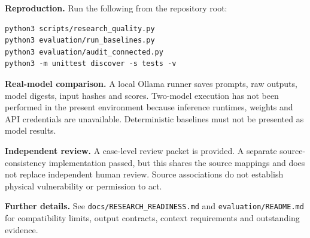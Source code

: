 \textbf{Reproduction.} Run the following from the repository root:
\begin{Verbatim}[fontsize=\small,breaklines=true]
python3 scripts/research_quality.py
python3 evaluation/run_baselines.py
python3 evaluation/audit_connected.py
python3 -m unittest discover -s tests -v
\end{Verbatim}

\textbf{Real-model comparison.} A local Ollama runner saves prompts, raw outputs, model digests, input hashes and scores. Two-model execution has not been performed in the present environment because inference runtimes, weights and API credentials are unavailable. Deterministic baselines must not be presented as model results.

\textbf{Independent review.} A case-level review packet is provided. A separate source-consistency implementation passed, but this shares the source mappings and does not replace independent human review. Source associations do not establish physical vulnerability or permission to act.

\textbf{Further details.} See \texttt{docs/RESEARCH\_READINESS.md} and \texttt{evaluation/README.md} for compatibility limits, output contracts, context requirements and outstanding evidence.

